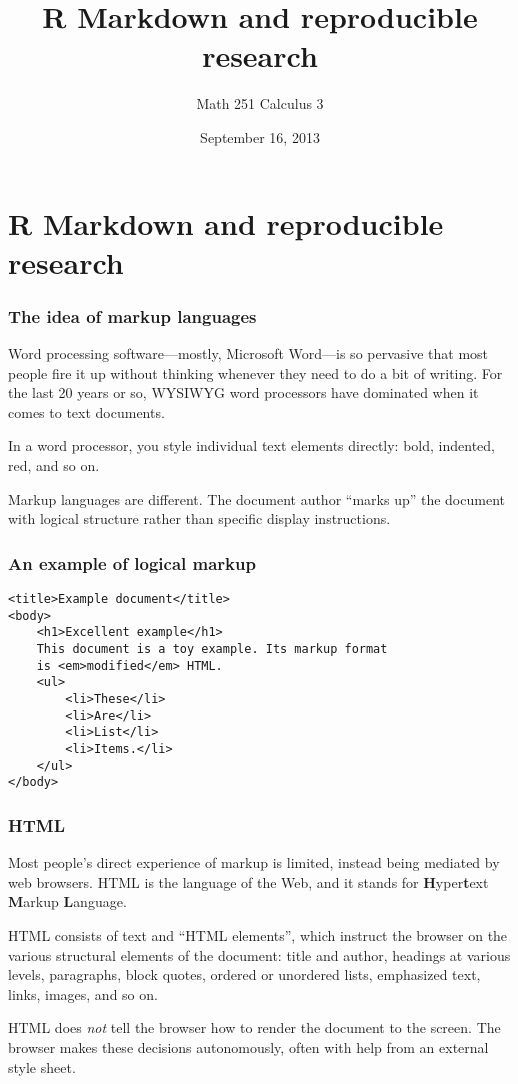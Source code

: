 \documentclass[11pt,ignorenonframetext,aspectratio=169]{beamer}
\title{R Markdown and reproducible research}
\author{Math 251 Calculus 3}
\date{September 16, 2013 }
\begin{document}
\frame{\titlepage}

\section{R Markdown and reproducible research}

\begin{frame}\frametitle{The idea of markup languages}

Word processing software---mostly, Microsoft Word---is so pervasive that
most people fire it up without thinking whenever they need to do a bit
of writing. For the last 20 years or so, WYSIWYG word processors have
dominated when it comes to text documents.

In a word processor, you style individual text elements directly: bold,
indented, red, and so on.

Markup languages are different. The document author ``marks up'' the
document with logical structure rather than specific display
instructions.

\end{frame}

\begin{frame}[fragile]\frametitle{An example of logical markup}

\begin{verbatim}
<title>Example document</title>
<body>
    <h1>Excellent example</h1>
    This document is a toy example. Its markup format
    is <em>modified</em> HTML.
    <ul>
        <li>These</li>
        <li>Are</li>
        <li>List</li>
        <li>Items.</li>
    </ul>
</body>
\end{verbatim}

\end{frame}

\begin{frame}\frametitle{HTML}

Most people's direct experience of markup is limited, instead being
mediated by web browsers. HTML is the language of the Web, and it stands
for \textbf{H}yper\textbf{t}ext \textbf{M}arkup \textbf{L}anguage.

HTML consists of text and ``HTML elements'', which instruct the browser
on the various structural elements of the document: title and author,
headings at various levels, paragraphs, block quotes, ordered or
unordered lists, emphasized text, links, images, and so on.

HTML does \emph{not} tell the browser how to render the document to the
screen. The browser makes these decisions autonomously, often with help
from an external style sheet.

\end{frame}
\end{document}
